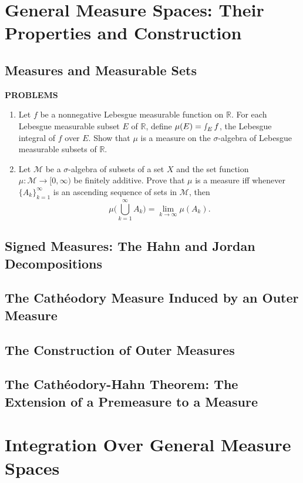 \documentclass[a4paper,10pt]{book}
\theoremstyle{plain} %
\begin{document}
\chapter{General Measure Spaces: Their Properties and Construction}

\section{Measures and Measurable Sets}

\begin{center}
	\textbf{PROBLEMS}
\end{center}
\begin{enumerate}
	\setcounter{enumi}{0}
	\item Let $f$ be a nonnegative Lebesgue measurable function on $\mathbb{R}$. 
	For each Lebesgue measurable subset $E$ of $\mathbb{R}$, define $\mu(E) = \smallint_E f$, the Lebesgue integral of $f$ over $E$.
	Show that $\mu$ is a measure on the $\sigma$-algebra of Lebesgue measurable subsets of $\mathbb{R}$.
	\item Let $\mathcal{M}$ be a $\sigma$-algebra of subsets of a set $X$ and the set function $\mu : \mathcal{M} \to [0,\infty)$ be finitely additive.
	Prove that $\mu$ is a measure iff whenever $\{A_k\}_{k=1}^\infty$ is an ascending sequence of sets in $\mathcal{M}$, then
	\[
	\mu \biggl ( \bigcup_{k=1}^\infty A_k \biggr ) = \lim_{k \to \infty} \mu(A_k).	
	\]
\end{enumerate}

\section{Signed Measures: The Hahn and Jordan Decompositions}
\section{The Cath\'eodory Measure Induced by an Outer Measure}
\section{The Construction of Outer Measures}
\section{The Cath\'eodory-Hahn Theorem: The Extension of a Premeasure to a Measure}

\chapter{Integration Over General Measure Spaces}
\end{document}
